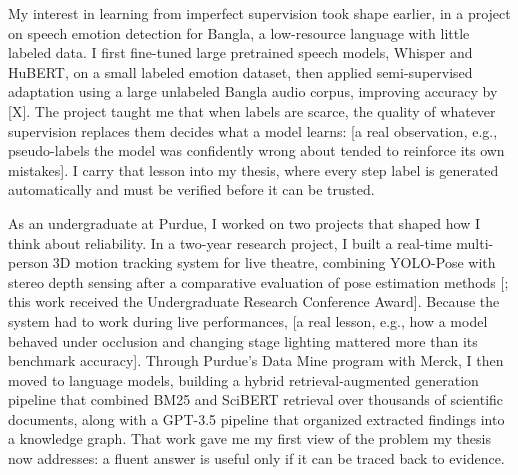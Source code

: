 \documentclass{article}
\begin{document}

My interest in learning from imperfect supervision took shape earlier, in a project on speech emotion detection for Bangla, a low-resource language with little labeled data. I first fine-tuned large pretrained speech models, Whisper and HuBERT, on a small labeled emotion dataset, then applied semi-supervised adaptation using a large unlabeled Bangla audio corpus, improving accuracy by [X]. The project taught me that when labels are scarce, the quality of whatever supervision replaces them decides what a model learns: [a real observation, e.g., pseudo-labels the model was confidently wrong about tended to reinforce its own mistakes]. I carry that lesson into my thesis, where every step label is generated automatically and must be verified before it can be trusted.


As an undergraduate at Purdue, I worked on two projects that shaped how I think about reliability. In a two-year research project, I built a real-time multi-person 3D motion tracking system for live theatre, combining YOLO-Pose with stereo depth sensing after a comparative evaluation of pose estimation methods [; this work received the Undergraduate Research Conference Award]. Because the system had to work during live performances, [a real lesson, e.g., how a model behaved under occlusion and changing stage lighting mattered more than its benchmark accuracy]. Through Purdue’s Data Mine program with Merck, I then moved to language models, building a hybrid retrieval-augmented generation pipeline that combined BM25 and SciBERT retrieval over thousands of scientific documents, along with a GPT-3.5 pipeline that organized extracted findings into a knowledge graph. That work gave me my first view of the problem my thesis now addresses: a fluent answer is useful only if it can be traced back to evidence.










\vspace{0.125in}
\end{document}
